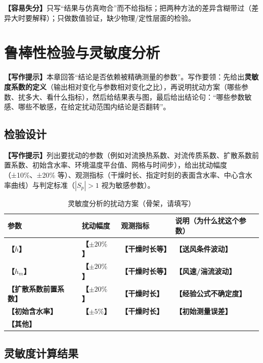 \documentclass[12pt,a4paper]{article}
\newcommand{\prompt}[1]{\par\noindent\textbf{【写作提示】}#1\par}      %
\newcommand{\pitfall}[1]{\par\noindent\textbf{【容易失分】}#1\par}     %
\newcommand{\ph}[1]{\textbf{【#1】}}                                   %
\begin{document}
\pitfall{只写“结果与仿真吻合”而不给指标；把两种方法的差异含糊带过（差异大时要解释）；只做数值验证，缺少物理/定性层面的检验。}

\clearpage

\section{鲁棒性检验与灵敏度分析}

\prompt{本章回答“结论是否依赖被精确测量的参数”。写作要领：先给出\textbf{灵敏度系数的定义}（输出相对变化与参数相对变化之比），再说明扰动方案（哪些参数、扰多大、看什么指标），然后给结果表与图，最后给出结论句：“哪些参数敏感、哪些不敏感，在给定扰动范围内结论是否翻转”。}

\subsection{检验设计}

\prompt{列出要扰动的参数（例如对流换热系数、对流传质系数、扩散系数前置系数、初始含水率、环境温度平台值、网格与时间步），给出扰动幅度（±10\%、±20\% 等）、观测指标（干燥时长、指定时刻的表面含水率、中心含水率曲线）与判定标准（$|S_p|>1$ 视为敏感参数）。}

\begin{table}[H]
\centering
\caption{灵敏度分析的扰动方案（骨架，请填写）}
\label{tab:sensitivity-plan}
\begin{tabular}{p{3.4cm}p{3.0cm}p{3.4cm}p{4.4cm}}
\toprule
参数 & 扰动幅度 & 观测指标 & 说明（为什么扰这个参数）\\
\midrule
\ph{$h$} & \ph{$\pm20\%$} & \ph{干燥时长等} & \ph{送风条件波动}\\
\ph{$h_m$} & \ph{$\pm20\%$} & \ph{干燥时长等} & \ph{风速/湍流波动}\\
\ph{扩散系数前置系数} & \ph{$\pm20\%$} & \ph{干燥时长} & \ph{经验公式不确定度}\\
\ph{初始含水率} & \ph{$\pm5\%$} & \ph{干燥时长} & \ph{初始测量误差}\\
\ph{其他} & & & \\
\bottomrule
\end{tabular}
\end{table}

\subsection{灵敏度计算结果}
\end{document}
